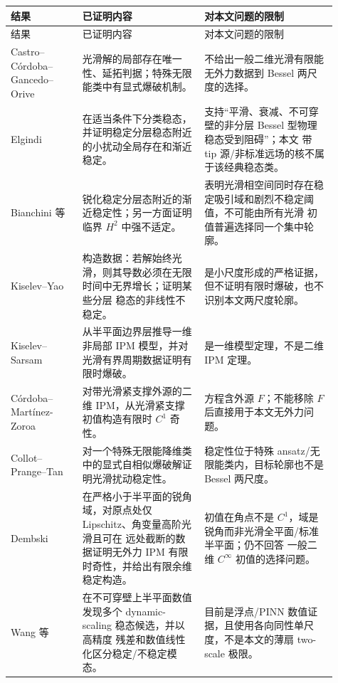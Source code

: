 \documentclass[11pt,a4paper,fontset=fandol]{ctexart}
\begin{document}
\begin{longtable}{>{\raggedright\arraybackslash}p{0.20\linewidth}
                  >{\raggedright\arraybackslash}p{0.34\linewidth}
                  >{\raggedright\arraybackslash}p{0.37\linewidth}}
\toprule
结果 & 已证明内容 & 对本文问题的限制 \\
\midrule
\endfirsthead
\toprule
结果 & 已证明内容 & 对本文问题的限制 \\
\midrule
\endhead
Castro--C\'ordoba--Gancedo--Orive~\cite{castro2007}
& 光滑解的局部存在唯一性、延拓判据；特殊无限能类中有显式爆破机制。
& 不给出一般二维光滑有限能无外力数据到 Bessel 两尺度的选择。\\

Elgindi~\cite{elgindi2017}
& 在适当条件下分类稳态，并证明稳定分层稳态附近的小扰动全局存在和渐近稳定。
& 支持“平滑、衰减、不可穿壁的非分层 Bessel 型物理稳态受到阻碍”；本文
带 tip 源/非标准远场的核不属于该经典稳态类。\\

Bianchini 等~\cite{bianchinijoparkwang2025,bianchinicordoba2025}
& 锐化稳定分层态附近的渐近稳定性；另一方面证明临界 $H^2$ 中强不适定。
& 表明光滑相空间同时存在稳定吸引域和剧烈不稳定阈值，不可能由所有光滑
初值普遍选择同一个集中轮廓。\\

Kiselev--Yao~\cite{kiselevyao2023}
& 构造数据：若解始终光滑，则其导数必须在无限时间中无界增长；证明某些分层
稳态的非线性不稳定。
& 是小尺度形成的严格证据，但不证明有限时爆破，也不识别本文两尺度轮廓。\\

Kiselev--Sarsam~\cite{kiselevsarsam2025}
& 从半平面边界层推导一维非局部 IPM 模型，并对光滑有界周期数据证明有限时爆破。
& 是一维模型定理，不是二维 IPM 定理。\\

C\'ordoba--Mart\'inez-Zoroa~\cite{cordobamartinez2024}
& 对带光滑紧支撑外源的二维 IPM，从光滑紧支撑初值构造有限时 $C^1$ 奇性。
& 方程含外源 $F$；不能移除 $F$ 后直接用于本文无外力问题。\\

Collot--Prange--Tan~\cite{collotprangetan2026}
& 对一个特殊无限能降维类中的显式自相似爆破解证明光滑扰动稳定性。
& 稳定性位于特殊 ansatz/无限能类内，目标轮廓也不是 Bessel 两尺度。\\

Dembski~\cite{dembski2025}
& 在严格小于半平面的锐角域，对原点处仅 Lipschitz、角变量高阶光滑且可在
远处截断的数据证明无外力 IPM 有限时奇性，并给出有限余维稳定构造。
& 初值在角点不是 $C^1$，域是锐角而非光滑全平面/标准半平面；仍不回答
一般二维 $C^\infty$ 初值的选择问题。\\

Wang 等~\cite{wang2025,wangleger2025}
& 在不可穿壁上半平面数值发现多个 dynamic-scaling 稳态候选，并以高精度
残差和数值线性化区分稳定/不稳定模态。
& 目前是浮点/PINN 数值证据，且使用各向同性单尺度，不是本文的薄扇
two-scale 极限。\\
\bottomrule
\end{longtable}
\end{document}
